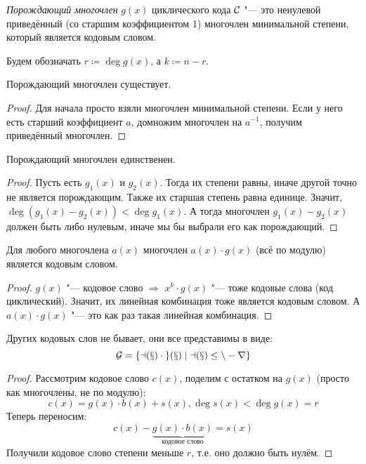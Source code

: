 \begin{Def}
	\textit{Порождающий многочлен} $g(x)$ циклического кода $\cal C$ "--- это
	ненулевой приведённый (со старшим коэффициентом 1) многочлен минимальной степени,
	который является кодовым словом.
\end{Def}
\begin{Rem}
	Будем обозначать $r \coloneqq \deg g(x)$, а $k \coloneqq n - r$.
\end{Rem}
\begin{lemma}
	Порождающий многочлен существует.
\end{lemma}
\begin{proof}
	Для начала просто взяли многочлен минимальной степени.
	Если у него есть старший коэффициент $a$,
	домножим многочлен на $a^{-1}$, получим приведённый многочлен.
\end{proof}
\begin{lemma}
	Порождающий многочлен единственен.
\end{lemma}
\begin{proof}
	Пусть есть $g_1(x)$ и $g_2(x)$.
	Тогда их степени равны, иначе другой точно не является порождающим.
	Также их старшая степень равна единице.
	Значит, $\deg (g_1(x)-g_2(x)) < \deg g_1(x)$.
	А тогда многочлен $g_1(x)-g_2(x)$ должен быть либо нулевым,
	иначе мы бы выбрали его как порождающий.
\end{proof}

\begin{theorem}
	Для любого многочлена $a(x)$ многочлен $a(x) \cdot g(x)$ (всё по модулю)
	является кодовым словом.
\end{theorem}
\begin{proof}
	$g(x)$ "--- кодовое слово $\Rightarrow$ $x^k\cdot g(x)$ "--- тоже кодовые слова (код циклический).
	Значит, их линейная комбинация тоже является кодовым словом.
	А $a(x) \cdot g(x)$ "--- это как раз такая линейная комбинация.
\end{proof}

\begin{theorem}\label{cycle_code_all_words}
	Других кодовых слов не бывает, они все представимы в виде:
	\[
		\cal G = \{ a(x) \cdot g(x) \mid a(x) \le n - r \}
	\]
\end{theorem}
\begin{proof}
	Рассмотрим кодовое слово $c(x)$, поделим с остатком на $g(x)$ (просто как многочлены, не по модулю):
	\[
		c(x) = g(x) \cdot b(x) + s(x), \deg s(x) < \deg g(x) = r
	\]
	Теперь переносим:
	\[
		c(x) - \underbrace{g(x) \cdot b(x)}_\text{кодовое слово} = s(x)
	\]
	Получили кодовое слово степени меньше $r$, т.е. оно должно быть нулём.
\end{proof}

